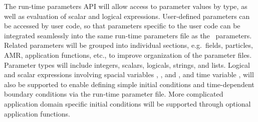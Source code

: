 \documentclass[11pt,letterpaper]{article}
\begin{document}



%
The run-time parameters API will allow access to parameter values by
type, as well as evaluation of scalar and logical expressions.
User-defined parameters can be accessed by user code, so that
parameters specific to the user code can be integrated seamlessly into
the same run-time parameters file as the \cello\ parameters.  Related
parameters will be grouped into individual sections, e.g.~fields,
particles, AMR, application functions, etc., to improve organization
of the parameter files.  Parameter types will include integers,
scalars, logicals, strings, and lists.  Logical and scalar expressions
involving spacial variables , , and , and time
variable , will also be supported to enable defining simple
initial conditions and time-dependent boundary conditions via the
run-time parameter file.  More complicated application domain specific
initial conditions will be supported through optional application
functions.
\end{document}
